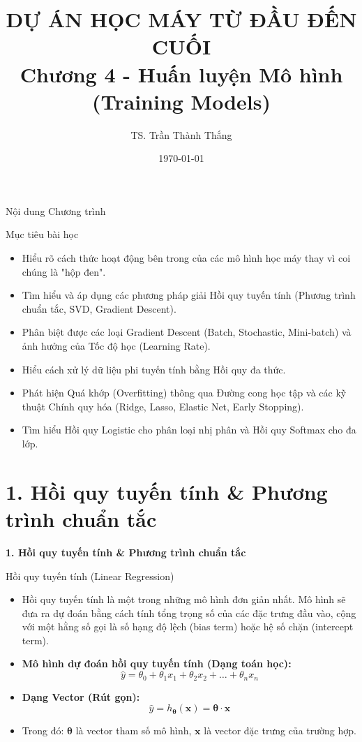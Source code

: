 \documentclass[aspectratio=169]{beamer}
\title[Chương 4: Huấn luyện Mô hình]{DỰ ÁN HỌC MÁY TỪ ĐẦU ĐẾN CUỐI \\ \vspace{0.5cm} \Large Chương 4 - Huấn luyện Mô hình (Training Models)}
\author{TS. Trần Thành Thắng}
\institute{Đại học Đông Á}
\date{\today}
\begin{document}
\begin{frame}
\titlepage
\end{frame}

\begin{frame}{Nội dung Chương trình}
\tableofcontents[hideallsubsections]
\end{frame}

\begin{frame}{Mục tiêu bài học}
\begin{itemize}
    \item Hiểu rõ cách thức hoạt động bên trong của các mô hình học máy thay vì coi chúng là "hộp đen".
    \item Tìm hiểu và áp dụng các phương pháp giải Hồi quy tuyến tính (Phương trình chuẩn tắc, SVD, Gradient Descent).
    \item Phân biệt được các loại Gradient Descent (Batch, Stochastic, Mini-batch) và ảnh hưởng của Tốc độ học (Learning Rate).
    \item Hiểu cách xử lý dữ liệu phi tuyến tính bằng Hồi quy đa thức.
    \item Phát hiện Quá khớp (Overfitting) thông qua Đường cong học tập và các kỹ thuật Chính quy hóa (Ridge, Lasso, Elastic Net, Early Stopping).
    \item Tìm hiểu Hồi quy Logistic cho phân loại nhị phân và Hồi quy Softmax cho đa lớp.
\end{itemize}
\end{frame}

\section{1. Hồi quy tuyến tính \& Phương trình chuẩn tắc}

\begin{frame}
\vfill\centering\LARGE\textbf{1. Hồi quy tuyến tính \& Phương trình chuẩn tắc}\vfill
\end{frame}

\begin{frame}{Hồi quy tuyến tính (Linear Regression)}
\begin{itemize}
    \item Hồi quy tuyến tính là một trong những mô hình đơn giản nhất. Mô hình sẽ đưa ra dự đoán bằng cách tính tổng trọng số của các đặc trưng đầu vào, cộng với một hằng số gọi là số hạng độ lệch (bias term) hoặc hệ số chặn (intercept term).
    \item \textbf{Mô hình dự đoán hồi quy tuyến tính (Dạng toán học):}
    \begin{equation}
    \hat{y} = \theta_0 + \theta_1 x_1 + \theta_2 x_2 + \dots + \theta_n x_n
    \end{equation}
    \item \textbf{Dạng Vector (Rút gọn):}
    \begin{equation}
    \hat{y} = h_{\boldsymbol{\theta}}(\mathbf{x}) = \boldsymbol{\theta} \cdot \mathbf{x}
    \end{equation}
    \item Trong đó: $\boldsymbol{\theta}$ là vector tham số mô hình, $\mathbf{x}$ là vector đặc trưng của trường hợp.
\end{itemize}
\end{frame}
\end{document}
